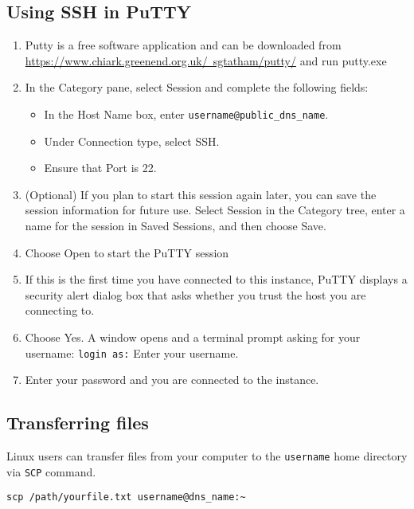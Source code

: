 \subsection{Using SSH in PuTTY}
\begin{enumerate}
     \item Putty is a free software application and can be downloaded from \href{https://www.chiark.greenend.org.uk/~sgtatham/putty/}{https://www.chiark.greenend.org.uk/~sgtatham/putty/} and run putty.exe
     \item In the Category pane, select Session and complete the following fields:

\begin{itemize}
\item In the Host Name box, enter \verb|username@public_dns_name|.
\item Under Connection type, select SSH.
\item Ensure that Port is 22.
\end{itemize}

\begin{figure}[!t]
    \centering
    \label{fig:putty}
\end{figure}
\item (Optional) If you plan to start this session again later, you can save the session information for future use. Select Session in the Category tree, enter a name for the session in Saved Sessions, and then choose Save.

\item Choose Open to start the PuTTY session

\item If this is the first time you have connected to this instance, PuTTY displays a security alert dialog box that asks whether you trust the host you are connecting to. 

\item Choose Yes. A window opens and a terminal prompt asking for your username:
\verb|login as:|
Enter your username.
\item Enter your password and you are connected to the instance. 
\end{enumerate}
   
\subsection{Transferring files}
Linux users can transfer files from your computer to the \verb|username| home directory via \verb|SCP| command.
\begin{verbatim}
scp /path/yourfile.txt username@dns_name:~
\end{verbatim}

